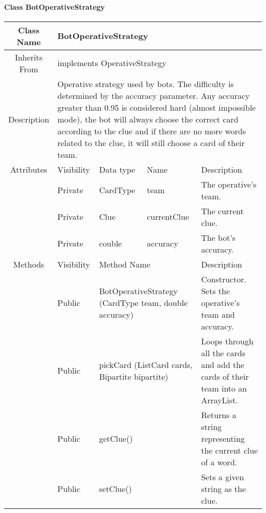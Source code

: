 \paragraph{Class BotOperativeStrategy}\mbox{}
\begin{tabularx}{\textwidth}{|c||l|l|l|X|}
    \hline
    \cellcolor{lightgray}Class Name & \multicolumn{4}{X|}{BotOperativeStrategy}\\
    \hline
    \cellcolor{lightgray}Inherits From & \multicolumn{4}{p{12cm}|}{implements OperativeStrategy}\\
    \hline
    \cellcolor{lightgray}Description & \multicolumn{4}{p{12cm}|}{Operative strategy used by bots. The difficulty is determined by the accuracy parameter. Any accuracy greater than 0.95 is considered hard (almost impossible mode), the bot will always choose the correct card according to the clue and if there are no more words related to the clue, it will still choose a card of their team.}\\
    \hline\hline
    
    \cellcolor{lightgray}Attributes & \cellcolor{lightgray}Visibility & \cellcolor{lightgray}Data type & \cellcolor{lightgray}Name & \cellcolor{lightgray}Description\\\cline{2-5}
    \cellcolor{lightgray} & Private & CardType & team & The operative's team.\\
    \hline
    \cellcolor{lightgray} & Private & Clue & currentClue & The current clue.\\
    \hline
    \cellcolor{lightgray} & Private & couble & accuracy & The bot's accuracy.\\
    \hline\hline
    
    \cellcolor{lightgray}Methods & \cellcolor{lightgray}Visibility & \multicolumn{2}{l|}{\cellcolor{lightgray}Method Name} & \cellcolor{lightgray}Description\\\cline{2-5}
    \hline
    \cellcolor{lightgray} & Public & \multicolumn{2}{X|}{BotOperativeStrategy (CardType team, double accuracy)} & Constructor. Sets the operative's team and accuracy.\\
    \hline
    \cellcolor{lightgray} & Public & \multicolumn{2}{X|}{pickCard (List\textlangle{}Card\textrangle{} cards, Bipartite bipartite)} & Loops through all the cards and add the cards of their team into an ArrayList.\\
    \hline
    \cellcolor{lightgray} & Public & \multicolumn{2}{l|}{getClue()} & Returns a string representing the current clue of a word.\\
    \hline
    \cellcolor{lightgray} & Public & \multicolumn{2}{l|}{setClue()} & Sets a given string as the clue.\\
    \hline
\end{tabularx}